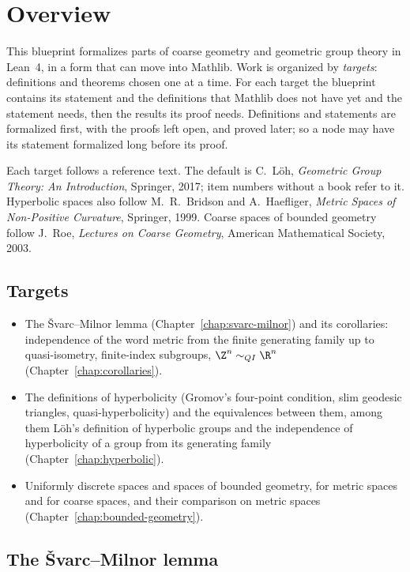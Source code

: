 \chapter{Overview}
\label{chap:overview}

This blueprint formalizes parts of coarse geometry and geometric group theory in Lean~4, in a
form that can move into Mathlib. Work is organized by \emph{targets}: definitions and theorems
chosen one at a time. For each target the blueprint contains its statement and the definitions
that Mathlib does not have yet and the statement needs, then the results its proof needs.
Definitions and statements are formalized first, with the proofs left open, and proved later;
so a node may have its statement formalized long before its proof.

Each target follows a reference text. The default is C.~L\"oh, \emph{Geometric Group Theory: An
Introduction}, Springer, 2017; item numbers without a book refer to it. Hyperbolic spaces also
follow M.~R.~Bridson and A.~Haefliger, \emph{Metric Spaces of Non-Positive Curvature},
Springer, 1999. Coarse spaces of bounded geometry follow J.~Roe, \emph{Lectures on
Coarse Geometry}, American Mathematical Society, 2003.

\section*{Targets}

\begin{itemize}
  \item The \v{S}varc--Milnor lemma (Chapter~\ref{chap:svarc-milnor}) and its corollaries:
        independence of the word metric from the finite generating family up to
        quasi-isometry, finite-index subgroups, $\Z^n \sim_{QI} \R^n$
        (Chapter~\ref{chap:corollaries}).
  \item The definitions of hyperbolicity (Gromov's four-point condition, slim geodesic triangles,
        quasi-hyperbolicity) and the equivalences between them, among them L\"oh's definition of
        hyperbolic groups and the independence of hyperbolicity of a group from its generating
        family (Chapter~\ref{chap:hyperbolic}).
  \item Uniformly discrete spaces and spaces of bounded geometry, for metric spaces and for
        coarse spaces, and their comparison on metric spaces
        (Chapter~\ref{chap:bounded-geometry}).
\end{itemize}

\section*{The \v{S}varc--Milnor lemma}

